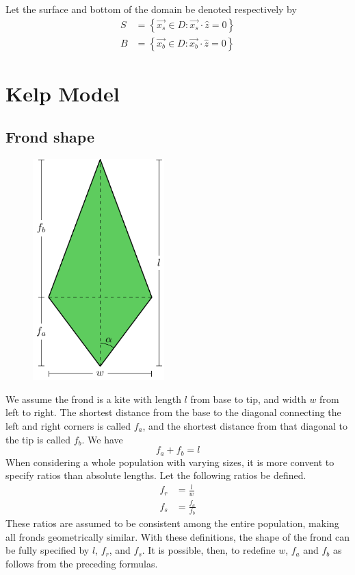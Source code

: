 Let the surface and bottom of the domain be denoted respectively by
\begin{align}
  S &= \left\{\vec{x_s} \in D: \vec{x_s} \cdot \hat{z} = 0 \right\} \\
  B &= \left\{\vec{x_b} \in D: \vec{x_b} \cdot \hat{z} = 0 \right\}
\end{align}


\section{Kelp Model}

\subsection{Frond shape}
\label{sec:shape}

\begin{figure}[h]
	\centering
	\includegraphics[width=2in]{frond}
	\label{fig:frond}
\end{figure}

We assume the frond is a kite with length $l$ from base to tip, and width $w$ from left to right.
 The shortest distance from the base to the diagonal connecting the left and right corners is called $f_a$, and the shortest distance from that diagonal to the tip is called $f_b$.
 We have
 \begin{equation}
	 f_a + f_b = l
 \end{equation}
When considering a whole population with varying sizes, it is more convent to specify ratios than absolute lengths.
Let the following ratios be defined.
\begin{align}
	f_r &= \frac{l}{w} \\
	f_s &= \frac{f_a}{f_b}
\end{align}
These ratios are assumed to be consistent among the entire population, making all fronds geometrically similar.
With these definitions, the shape of the frond can be fully specified by $l$, $f_r$, and $f_s$.
It is possible, then, to redefine $w$, $f_a$ and $f_b$ as follows from the preceding formulas.

